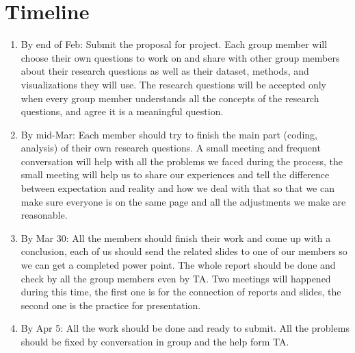 \documentclass[12pt]{article}
\begin{document}
\section{Timeline}
\begin{enumerate}
	\item By end of Feb: Submit the proposal for project. Each group member will choose their own questions to work on and share with other group members about their research questions as well as their dataset, methods, and visualizations they will use. The research questions will  be accepted only when every group member understands all the concepts of the research questions, and agree it is a meaningful question.
	\item By mid-Mar: Each member should try to finish the main part (coding, analysis) of their own research questions. A small meeting and frequent conversation will help with all the problems we faced during the process, the small meeting will help us to share our experiences and tell the difference between expectation and reality and how we deal with that so that we can make sure everyone is on the same page and all the adjustments we make are reasonable.
	\item By Mar 30: All the members should finish their work and come up with a conclusion, each of us should send the related slides to one of our members so we can get a completed power point. The whole report should be done and check by all the group members even by TA. Two meetings will happened during this time, the first one is for the connection of reports and slides, the second one is the practice for presentation.
	\item By Apr 5: All the work should be done and ready to submit. All the problems should be fixed by conversation in group and the help form TA. 



\end{enumerate}
\end{document}
